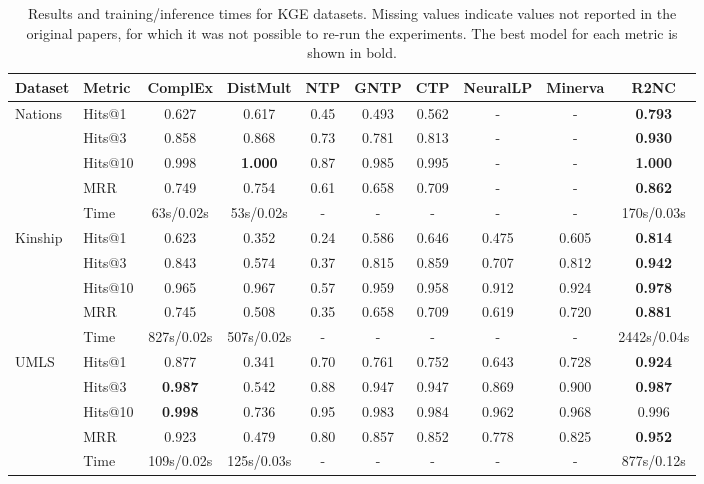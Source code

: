 \documentclass[journal]{IEEEtran}
\begin{document}
\begin{table*}[th]
\caption{Results and training/inference times for KGE datasets. Missing values indicate values not reported in the original papers, for which it was not possible to re-run the experiments. The best model for each metric is shown in bold.}
\centering
{\small
\begin{tabular}{l|l|cccccccc}
Dataset & Metric & ComplEx & DistMult & NTP & GNTP & CTP &  NeuralLP & Minerva & R2NC\\
\hline
Nations & Hits@1 & 0.627 & 0.617 & 0.45 & 0.493 & 0.562 & - &  - & {\bf 0.793}\\
        & Hits@3 & 0.858 & 0.868 & 0.73 & 0.781 & 0.813 & - & - & {\bf 0.930}\\
        & Hits@10 & 0.998 & {\bf 1.000} & 0.87 & 0.985 & 0.995 & - & - & {\bf 1.000}\\
        & MRR     & 0.749 & 0.754 & 0.61 & 0.658 & 0.709 & - & - & {\bf 0.862}\\
        & Time & 63s/0.02s & 53s/0.02s  & - & - & - & - & - & 170s/0.03s \\
\hline
Kinship & Hits@1 & 0.623 & 0.352 & 0.24 & 0.586 & 0.646 & 0.475 & 0.605 & {\bf 0.814}\\
        & Hits@3 & 0.843 & 0.574 & 0.37 & 0.815 & 0.859 & 0.707 & 0.812 & {\bf 0.942}\\
        & Hits@10 & 0.965 & 0.967 & 0.57 & 0.959 & 0.958 & 0.912 & 0.924 & {\bf 0.978}\\
        & MRR & 0.745 & 0.508 & 0.35 & 0.658 & 0.709 & 0.619 & 0.720 & {\bf 0.881}\\
        & Time & 827s/0.02s & 507s/0.02s  & - & - & - & - & - & 2442s/0.04s \\
\hline
UMLS    & Hits@1 & 0.877 & 0.341 & 0.70 & 0.761  &  0.752& 0.643 & 0.728 & \textbf{0.924}\\
        & Hits@3 & \textbf{0.987} & 0.542 & 0.88 & 0.947  &  0.947 & 0.869 & 0.900 & \textbf{0.987}\\
        & Hits@10 & \textbf{0.998} & 0.736 & 0.95 & 0.983  & 0.984 & 0.962 & 0.968 & 0.996\\
        & MRR & 0.923 & 0.479  & 0.80 & 0.857  & 0.852 & 0.778 & 0.825 & \textbf{0.952} \\
        & Time & 109s/0.02s & 125s/0.03s  & - & - & - & - & - & 877s/0.12s \\

\end{tabular}}
\end{table*}
\end{document}
